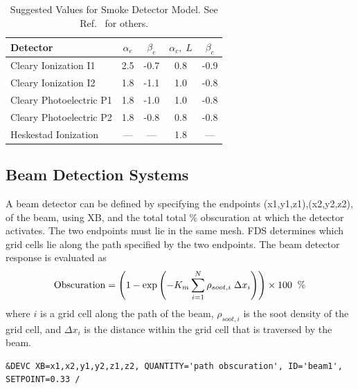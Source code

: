 \documentclass[11pt]{book}
\newcommand{\be}{\begin{equation}}
\newcommand{\ee}{\end{equation}}
\begin{document}
\begin{table}[ht]
\caption{Suggested Values for Smoke Detector Model. See Ref.~\cite{SFPE} for others.}
\vspace{0.1in}
\label{tab:sdvalues}
\begin{center}
\begin{tabular}{|l||c|c|c|c|}
\hline
Detector                      & $\alpha_e$  &  $\beta_e$   &  $\alpha_c, \; L$   &  $\beta_c$  \\ \hline \hline
Cleary Ionization    I1       & 2.5         & -0.7         &  0.8                &  -0.9      \\ \hline
Cleary Ionization    I2       & 1.8         & -1.1         &  1.0                &  -0.8      \\ \hline
Cleary Photoelectric P1       & 1.8         & -1.0         &  1.0                &  -0.8      \\ \hline
Cleary Photoelectric P2       & 1.8         & -0.8         &  0.8                &  -0.8      \\ \hline
Heskestad Ionization          & ---         & ---          &  1.8                &  ---       \\ \hline\end{tabular}
\end{center}
\end{table}


\subsection{Beam Detection Systems}
\label{info:beam_detector}

A beam detector can be defined by specifying the endpoints {\ct (x1,y1,z1),(x2,y2,z2)}, of the beam, using {\ct XB}, and the total
total \% obscuration at which the detector activates.  The two endpoints must lie in the same mesh.  FDS determines which grid
cells lie along the path specified by the two endpoints.  The beam detector response is evaluated as
\be
  \hbox{Obscuration}  = \left(1 - \exp \left( -K_m \sum_{i=1}^N {\rho_{soot,i}\; \Delta x_i} \right)  \right) \times 100  \; \; \hbox{\%}
\ee
where $i$ is a grid cell along the path of the beam, $\rho_{soot,i}$ is the soot density of the grid cell, and $ \Delta x_i$
is the distance within the grid cell that is traversed by the beam.

\footnotesize
\begin{verbatim}
&DEVC XB=x1,x2,y1,y2,z1,z2, QUANTITY='path obscuration', ID='beam1', SETPOINT=0.33 /
\end{verbatim}
\normalsize
\end{document}
